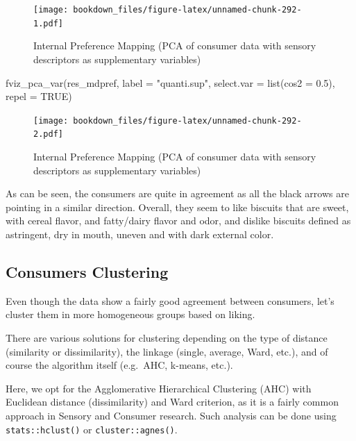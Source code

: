 \documentclass[
]{krantz}
\makeatletter
\newenvironment{Shaded}{\begin{snugshade}}{\end{snugshade}}
\newcommand{\AttributeTok}[1]{\textcolor[rgb]{0.61,0.61,0.61}{#1}}
\newcommand{\ConstantTok}[1]{\textcolor[rgb]{0,0,0}{#1}}
\newcommand{\FloatTok}[1]{\textcolor[rgb]{0.06,0.06,0.06}{#1}}
\newcommand{\FunctionTok}[1]{\textcolor[rgb]{0,0,0}{#1}}
\newcommand{\NormalTok}[1]{#1}
\newcommand{\StringTok}[1]{\textcolor[rgb]{0.5,0.5,0.5}{#1}}
\newenvironment{kframe}{%
\medskip{}
\setlength{\fboxsep}{.8em}
 \def\at@end@of@kframe{}%
 \ifinner\ifhmode%
  \def\at@end@of@kframe{\end{minipage}}%
  \begin{minipage}{\columnwidth}%
 \fi\fi%
 \def\FrameCommand##1{\hskip\@totalleftmargin \hskip-\fboxsep
 \colorbox{shadecolor}{##1}\hskip-\fboxsep
     \hskip-\linewidth \hskip-\@totalleftmargin \hskip\columnwidth}%
 \MakeFramed {\advance\hsize-\width
   \@totalleftmargin\z@ \linewidth\hsize
   \@setminipage}}%
 {\par\unskip\endMakeFramed%
 \at@end@of@kframe}
\renewenvironment{Shaded}{\begin{kframe}}{\end{kframe}}
\makeatother
\begin{document}
\begin{figure}
\centering
\texttt{[image: bookdown\_files/figure-latex/unnamed-chunk-292-1.pdf]}
\caption{\label{fig:unnamed-chunk-292-1}Internal Preference Mapping (PCA of consumer data with sensory descriptors as supplementary variables)}
\end{figure}

\begin{Shaded}
\begin{Highlighting}[]
\FunctionTok{fviz\_pca\_var}\NormalTok{(res\_mdpref, }\AttributeTok{label =} \StringTok{"quanti.sup"}\NormalTok{, }
             \AttributeTok{select.var =} \FunctionTok{list}\NormalTok{(}\AttributeTok{cos2 =} \FloatTok{0.5}\NormalTok{), }\AttributeTok{repel =} \ConstantTok{TRUE}\NormalTok{)}
\end{Highlighting}
\end{Shaded}

\begin{figure}
\centering
\texttt{[image: bookdown\_files/figure-latex/unnamed-chunk-292-2.pdf]}
\caption{\label{fig:unnamed-chunk-292-2}Internal Preference Mapping (PCA of consumer data with sensory descriptors as supplementary variables)}
\end{figure}

As can be seen, the consumers are quite in agreement as all the black arrows are pointing in a similar direction.
Overall, they seem to like biscuits that are sweet, with cereal flavor, and fatty/dairy flavor and odor, and dislike biscuits defined as astringent, dry in mouth, uneven and with dark external color.

\hypertarget{hac}{%
\subsection{Consumers Clustering}\label{hac}}

Even though the data show a fairly good agreement between consumers, let's cluster them in more homogeneous groups based on liking.

There are various solutions for clustering depending on the type of distance (similarity or dissimilarity), the linkage (single, average, Ward, etc.), and of course the algorithm itself (e.g.~AHC, k-means, etc.).

Here, we opt for the Agglomerative Hierarchical Clustering (AHC) with Euclidean distance (dissimilarity) and Ward criterion, as it is a fairly common approach in Sensory and Consumer research. Such analysis can be done using \texttt{stats::hclust()} or \texttt{cluster::agnes()}.
\end{document}
